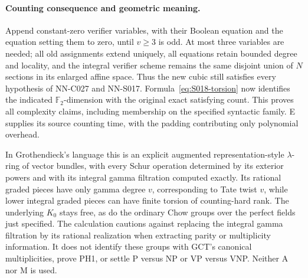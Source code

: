 \paragraph{Counting consequence and geometric meaning.}
Append constant-zero verifier variables, with their Boolean equation
and the equation setting them to zero, until $v\ge3$ is odd.
At most three variables are needed; all old assignments extend
uniquely, all equations retain bounded degree and locality, and
the integral verifier scheme remains the same disjoint union of
$N$ sections in its enlarged affine space. Thus the new cubic
still satisfies every hypothesis of NN-C027 and NN-S017.
Formula~\eqref{eq:S018-torsion} now identifies the indicated
$\mathbb F_2$-dimension with the original exact satisfying count.
This proves all complexity claims, including membership on the
specified syntactic family. E supplies its source counting time,
with the padding contributing only polynomial overhead.

In Grothendieck's language this is an explicit augmented
representation-style $\lambda$-ring of vector bundles, with every
Schur operation determined by its exterior powers and with its
integral gamma filtration computed exactly. Its rational graded
pieces have only gamma degree $v$, corresponding to Tate twist
$v$, while lower
integral graded pieces can have finite torsion of counting-hard
rank. The underlying $K_0$ stays free, as do the ordinary Chow groups
over the perfect fields just specified.
The calculation cautions against replacing the integral gamma
filtration by its rational realization when extracting parity
or multiplicity information. It does not identify these groups
with GCT's canonical multiplicities, prove PH1, or settle P versus
NP or VP versus VNP. Neither A nor M is used.

